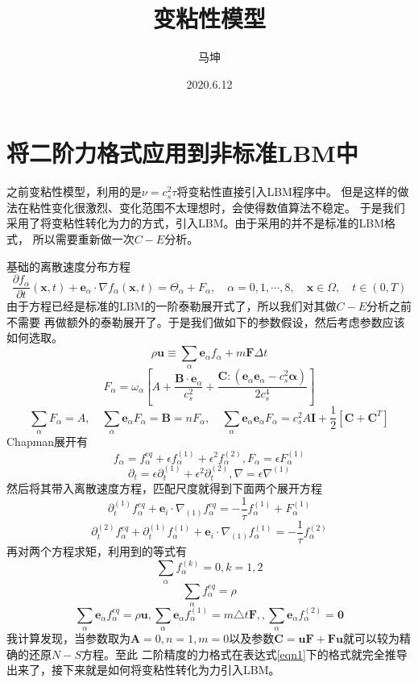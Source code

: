 \documentclass[11pt,UTF8]{ctexart}
\title{变粘性模型}
\author{马坤}
\date{2020.6.12}
\begin{document}
    \maketitle
    \section{将二阶力格式应用到非标准LBM中}
    \par{之前变粘性模型，利用的是$\nu = c_s^2\tau$将变粘性直接引入LBM程序中。
    但是这样的做法在粘性变化很激烈、变化范围不太理想时，会使得数值算法不稳定。
    于是我们采用了将变粘性转化为力的方式，引入LBM。由于采用的并不是标准的LBM格式，
    所以需要重新做一次$C-E$分析。}
    \par{基础的离散速度分布方程
    \begin{equation}
	\frac{\partial f_{\alpha}}{\partial t}(\mathbf{x}, t)+\mathbf{e}_{\alpha} \cdot \nabla f_{\alpha}(\mathbf{x}, t)=\Theta_{\alpha} + F_{\alpha}, \quad \alpha=0,1, \cdots, 8, \quad \mathbf{x} \in \Omega, \quad t \in(0, T)
	\label{eqn1}
	\end{equation}
    由于方程已经是标准的LBM的一阶泰勒展开式了，所以我们对其做$C-E$分析之前不需要
    再做额外的泰勒展开了。于是我们做如下的参数假设，然后考虑参数应该如何选取。
    $$\rho \mathbf{u}\equiv \sum_{\alpha} \mathbf{e}_{\alpha} f_{\alpha}+m \mathbf{F} \Delta t$$
    $$F_{\alpha}=\omega_{\alpha}\left[A+\frac{\mathbf{B} \cdot \mathbf{e}_{\alpha}}{c_{s}^{2}}+\frac{\mathbf{C}:\left(\mathbf{e}_{\alpha} \mathbf{e}_{\alpha}-c_{s}^{2} \mathbf{\alpha}\right)}{2 c_{s}^{4}}\right]$$
    $$\sum_{\alpha} F_{\alpha}=A, \quad \sum_{\alpha} \mathbf{e}_{\alpha} F_{\alpha}=\mathbf{B} = nF_{\alpha}, \quad \sum_{\alpha} \mathbf{e}_{\alpha} \mathbf{e}_{\alpha} F_{\alpha}=c_{s}^{2} A \mathbf{I}+\frac{1}{2}\left[\mathbf{C}+\mathbf{C}^{T}\right]$$
    Chapman展开有
    $$f_{\alpha} = f_{\alpha}^{eq} + \epsilon f_{\alpha}^{(1)} + \epsilon^2 f_{\alpha}^{(2)},F_{\alpha}=\epsilon F_{\alpha}^{(1)}$$
    $$\partial_t = \epsilon \partial_t^{(1)}+\epsilon^2 \partial_t^{(2)},\nabla = \epsilon \nabla^{(1)}$$
    然后将其带入离散速度方程，匹配尺度就得到下面两个展开方程
    $$\partial_t^{(1)} f^{eq}_{\alpha}+\mathbf{e}_i \cdot \nabla_{(1)}f_{\alpha}^{eq} = -\frac{1}{\tau}f^{(1)}_{\alpha}+F^{(1)}_{\alpha}$$
    $$\partial_t^{(2)} f^{eq}_{\alpha}+\partial_t^{(1)} f^{(1)}_{\alpha}+\mathbf{e}_i \cdot \nabla_{(1)}f_{\alpha}^{(1)}=-\frac{1}{\tau}f_{\alpha}^{(2)}$$
    再对两个方程求矩，利用到的等式有
    $$\sum_{\alpha}f_{\alpha}^{(k)}=0,k=1,2$$$$\sum_{\alpha}f_{\alpha}^{eq}=\rho$$
    $$\sum_{\alpha}\mathbf{e}_{\alpha}f_{\alpha}^{eq}=\rho\mathbf{u},\sum_{\alpha}\mathbf{e}_{\alpha} f_{\alpha}^{(1)} = m\triangle t \mathbf{F},,\sum_{\alpha}\mathbf{e}_{\alpha} f_{\alpha}^{(2)} = \mathbf{0}$$
    我计算发现，当参数取为$\mathbf{A}=0,n=1,m=0$以及参数$\mathbf{C}=\mathbf{u}\mathbf{F}+\mathbf{F u}$就可以较为精确的还原$N-S$方程。至此
    二阶精度的力格式在表达式\ref {eqn1}下的格式就完全推导出来了，接下来就是如何将变粘性转化为力引入LBM。}
\end{document}
